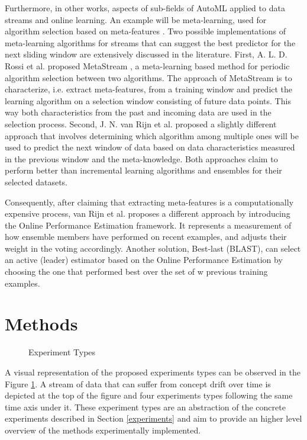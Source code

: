 \documentclass{sig-alternate-br}
\begin{document}
Furthermore, in other works, aspects of sub-fields of AutoML applied to data streams and online learning. An example will be meta-learning, used for algorithm selection based on meta-features \cite{rossi2017guidance}. Two possible implementations of meta-learning algorithms for streams that can suggest the best predictor for the next sliding window are extensively discussed in the literature. First, A. L. D. Rossi et al. proposed MetaStream \cite{rossi2014metastream}, a meta-learning based method for periodic algorithm selection between two algorithms. The approach of MetaStream is to characterize, i.e. extract meta-features, from a training window and predict the learning algorithm on a selection window consisting of future data points. This way both characteristics from the past and incoming data are used in the selection process. Second, J. N. van Rijn et al. \cite{van2014algorithm} proposed a slightly different approach that involves determining which algorithm among multiple ones will be used to predict the next window of data based on data characteristics measured in the previous window and the meta-knowledge. Both approaches claim to perform better than incremental learning algorithms and ensembles for their selected datasets.

Consequently, after claiming that extracting meta-features is a computationally expensive process, van Rijn et al. \cite{van2018online} proposes a different approach by introducing the Online Performance Estimation framework. It represents a measurement of how ensemble members have performed on recent examples, and adjusts their weight in the voting accordingly. Another solution, Best-last (BLAST), can select an active (leader) estimator based on the Online Performance Estimation by choosing the one that performed best over the set of w previous training examples.

\section{Methods}

\begin{figure}
\centering 
{}
\caption{Experiment Types}
\label{fig:experiments}
\end{figure}

A visual representation of the proposed experiments types can be observed in the Figure \ref{fig:experiments}. A stream of data that can suffer from concept drift over time is depicted at the top of the figure and four experiments types following the same time axis under it. These experiment types are an abstraction of the concrete experiments described in Section \ref{experiments} and aim to provide an higher level overview of the methods experimentally implemented.
\end{document}
